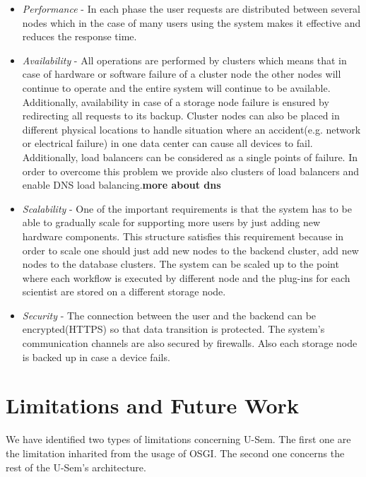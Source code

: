 \begin{itemize}

\item \textit{Performance} - In each phase the user requests are distributed between several nodes which in the case of many users using the system makes it effective and reduces the response time.

\item \textit{Availability} - All operations are performed by clusters which means that in case of hardware or software failure of a cluster node the other nodes will continue to operate and the entire system will continue to be available. Additionally, availability in case of a storage node failure is ensured by redirecting all requests to its backup. Cluster nodes can also be placed in different physical locations to handle situation where an accident(e.g. network or electrical failure) in one data center can cause all devices to fail. Additionally, load balancers can be considered as a single points of failure. In order to overcome this problem we provide also clusters of load balancers and enable DNS load balancing.\textbf{more about dns}

\item \textit{Scalability} - One of the important requirements is that the system has to be able to gradually scale for supporting more users  by just adding new hardware components. This structure satisfies this requirement because in order to scale one should just add new nodes to the backend cluster, add new nodes to the database clusters. The system can be scaled up to the point where each workflow is executed by different node and the plug-ins for each scientist are stored on a different storage node.

\item \textit{Security} - The connection between the user and the backend can be encrypted(HTTPS) so that data transition is protected. The system's communication channels are also secured by firewalls. Also each storage node is backed up in case a device fails.

\end{itemize}


\section{Limitations and Future Work}

We have identified two types of limitations concerning U-Sem. The first one are the limitation inharited from the usage of OSGI. The second one concerns the rest of the U-Sem's architecture.

